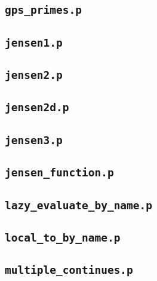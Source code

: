 \documentclass[a4paper,9pt]{article}
\begin{document}
\begin{multicols}{2}
\subsection{\textbf{\texttt{gps\_primes.p}}}


\subsection{\textbf{\texttt{jensen1.p}}}


\subsection{\textbf{\texttt{jensen2.p}}}


\subsection{\textbf{\texttt{jensen2d.p}}}


\subsection{\textbf{\texttt{jensen3.p}}}


\subsection{\textbf{\texttt{jensen\_function.p}}}


\subsection{\textbf{\texttt{lazy\_evaluate\_by\_name.p}}}


\subsection{\textbf{\texttt{local\_to\_by\_name.p}}}


\subsection{\textbf{\texttt{multiple\_continues.p}}}



\end{multicols}
\end{document}
